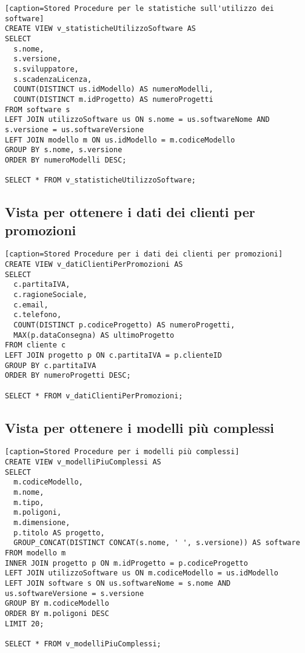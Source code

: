 \documentclass[a4paper,11pt]{article}
\begin{document}
{\begin{lstlisting}[style=SQL][caption=Stored Procedure per le statistiche sull'utilizzo dei software]
CREATE VIEW v_statisticheUtilizzoSoftware AS
SELECT 
  s.nome,
  s.versione,
  s.sviluppatore,
  s.scadenzaLicenza,
  COUNT(DISTINCT us.idModello) AS numeroModelli,
  COUNT(DISTINCT m.idProgetto) AS numeroProgetti
FROM software s
LEFT JOIN utilizzoSoftware us ON s.nome = us.softwareNome AND s.versione = us.softwareVersione
LEFT JOIN modello m ON us.idModello = m.codiceModello
GROUP BY s.nome, s.versione
ORDER BY numeroModelli DESC;

SELECT * FROM v_statisticheUtilizzoSoftware;
\end{lstlisting}

\subsection{Vista per ottenere i dati dei clienti per promozioni}

\begin{lstlisting}[style=SQL][caption=Stored Procedure per i dati dei clienti per promozioni]
CREATE VIEW v_datiClientiPerPromozioni AS
SELECT 
  c.partitaIVA,
  c.ragioneSociale,
  c.email,
  c.telefono,
  COUNT(DISTINCT p.codiceProgetto) AS numeroProgetti,
  MAX(p.dataConsegna) AS ultimoProgetto
FROM cliente c
LEFT JOIN progetto p ON c.partitaIVA = p.clienteID
GROUP BY c.partitaIVA
ORDER BY numeroProgetti DESC;

SELECT * FROM v_datiClientiPerPromozioni;
\end{lstlisting}

\newpage
\subsection{Vista per ottenere i modelli più complessi}

\begin{lstlisting}[style=SQL][caption=Stored Procedure per i modelli più complessi]
CREATE VIEW v_modelliPiuComplessi AS
SELECT 
  m.codiceModello,
  m.nome,
  m.tipo,
  m.poligoni,
  m.dimensione,
  p.titolo AS progetto,
  GROUP_CONCAT(DISTINCT CONCAT(s.nome, ' ', s.versione)) AS software
FROM modello m
INNER JOIN progetto p ON m.idProgetto = p.codiceProgetto
LEFT JOIN utilizzoSoftware us ON m.codiceModello = us.idModello
LEFT JOIN software s ON us.softwareNome = s.nome AND us.softwareVersione = s.versione
GROUP BY m.codiceModello
ORDER BY m.poligoni DESC
LIMIT 20;

SELECT * FROM v_modelliPiuComplessi;


\end{lstlisting}}
\end{document}
